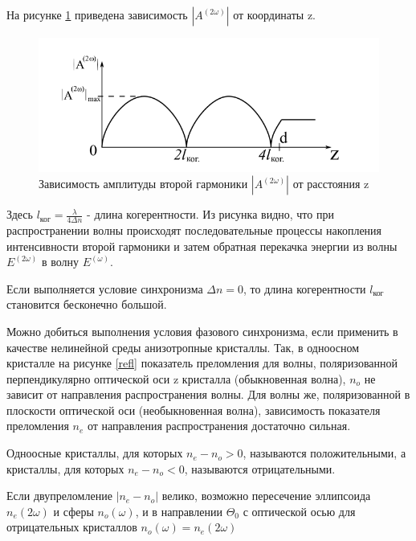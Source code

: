 \documentclass[a4paper,12pt]{article} %
\begin{document}
На рисунке \ref{garm} приведена зависимость $| A^{(2\omega)} |$ от координаты z.

\begin{figure}[H]
\centering
\includegraphics[scale=1]{pic2.png}
\caption{Зависимость амплитуды второй гармоники $| A^{(2\omega)} |$ от расстояния z}
\label{garm}
\end{figure}

Здесь $l_\text{ког} = \frac{\lambda}{4 \Delta n}$ - длина когерентности. Из рисунка видно, что при распространении волны происходят последовательные процессы накопления интенсивности второй гармоники и затем обратная перекачка энергии из волны $E^{(2\omega)}$ в волну $E^{(\omega)}$.

Если выполняется условие синхронизма $\Delta n = 0$, то длина когерентности $l_\text{ког}$ становится бесконечно большой.

Можно добиться выполнения условия фазового синхронизма, если применить в качестве нелинейной среды анизотропные кристаллы. Так, в одноосном кристалле на рисунке \ref{refl} показатель преломления для волны, поляризованной перпендикулярно оптической оси z кристалла (обыкновенная волна), $n_o$ не зависит от направления распространения волны. Для волны же, поляризованной в плоскости оптической оси (необыкновенная волна), зависимость показателя преломления $n_e$ от направления распространения достаточно сильная.

Одноосные кристаллы, для которых $n_e - n_o > 0$, называются положительными, а
кристаллы, для которых $n_e - n_o < 0$, называются отрицательными.

Если двупреломление $|n_e - n_o|$ велико, возможно пересечение эллипсоида $n_e(2\omega)$ и сферы $n_o(\omega)$, и в направлении $\Theta_0$ с оптической осью для отрицательных кристаллов $n_o(\omega) = n_e(2\omega)$
\end{document}
